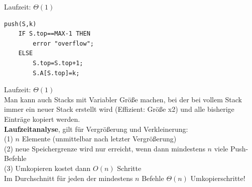 \documentclass{article}
\begin{document}
            Laufzeit: $\Theta(1)$
            \begin{lstlisting}[style=pseudocode]
push(S,k)
    IF S.top==MAX-1 THEN
        error "overflow";
    ELSE
        S.top=S.top+1;
        S.A[S.top]=k;
            \end{lstlisting}
            Laufzeit: $\Theta(1)$\\
            Man kann auch Stacks mit Variabler Größe machen, bei der bei vollem Stack immer ein neuer Stack erstellt wird (Effizient: Größe x2) und alle bisherige Einträge kopiert werden.\\
            \textbf{Laufzeitanalyse}, gilt für Vergrößerung und Verkleinerung:\\
            (1) $n$ Elemente (unmittelbar nach letzter Vergrößerung) \\
            (2) neue Speichergrenze wird nur erreicht, wenn dann mindestens $n$ viele Push-Befehle \\
            (3) Umkopieren kostet dann $O(n)$ Schritte \\
            Im Durchschnitt für jeden der mindestens $n$ Befehle $\Theta(n)$ Umkopierschritte!
\end{document}
